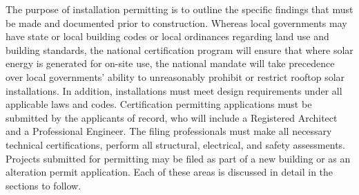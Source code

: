 \noindent The purpose of installation permitting is to outline the specific findings that must be made and documented prior to construction. Whereas local governments may have state or local building codes or local ordinances regarding land use and building standards, the national certification program will ensure that where solar energy is generated for on-site use, the national mandate will take precedence over local governments’ ability to unreasonably prohibit or restrict rooftop solar installations.
In addition, installations must meet design requirements under all applicable laws and codes. Certification permitting applications must be submitted by the applicants of record, who will include a Registered Architect and a Professional Engineer. The filing professionals must make all necessary technical certifications, perform all structural, electrical, and safety assessments. Projects submitted for permitting may be filed as part of a new building or as an alteration permit application. Each of these areas is discussed in detail in the sections to follow.

